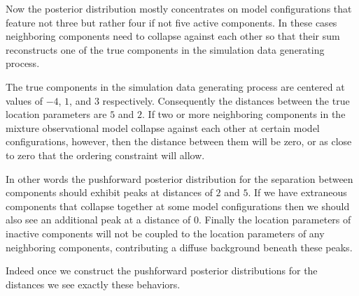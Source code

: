 \documentclass[
  letterpaper,
  DIV=11,
  numbers=noendperiod]{scrartcl}
\begin{document}
Now the posterior distribution mostly concentrates on model
configurations that feature not three but rather four if not five active
components. In these cases neighboring components need to collapse
against each other so that their sum reconstructs one of the true
components in the simulation data generating process.

The true components in the simulation data generating process are
centered at values of \(-4\), \(1\), and \(3\) respectively.
Consequently the distances between the true location parameters are
\(5\) and \(2\). If two or more neighboring components in the mixture
observational model collapse against each other at certain model
configurations, however, then the distance between them will be zero, or
as close to zero that the ordering constraint will allow.

In other words the pushforward posterior distribution for the separation
between components should exhibit peaks at distances of \(2\) and \(5\).
If we have extraneous components that collapse together at some model
configurations then we should also see an additional peak at a distance
of \(0\). Finally the location parameters of inactive components will
not be coupled to the location parameters of any neighboring components,
contributing a diffuse background beneath these peaks.

Indeed once we construct the pushforward posterior distributions for the
distances we see exactly these behaviors.
\end{document}
